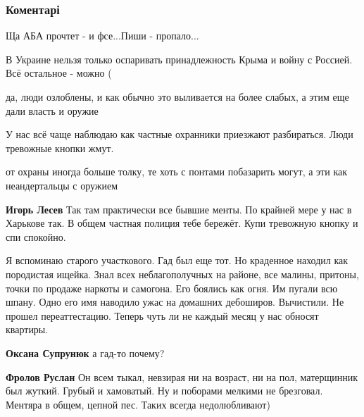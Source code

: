  
 
 
 
 
\subsubsection{Коментарі}
\label{sec:24_06_2019.fb.lesev_igor.1.bespredel_menty.cmt}

\begin{itemize} %
Ща АБА прочтет - и фсе...Пиши - пропало...

В Украине нельзя только оспаривать принадлежность Крыма и войну с Россией. Всё остальное - можно (

да, люди озлоблены, и как обычно это выливается на более слабых, а этим еще дали власть и оружие

У нас всё чаще наблюдаю как частные охранники приезжают разбираться. Люди тревожные кнопки жмут.

\begin{itemize} %
от охраны иногда больше толку, те хоть с понтами побазарить могут, а эти как неандертальцы с оружием

\textbf{Игорь Лесев} Так там практически все бывшие менты. По крайней мере у нас в Харькове так. В общем частная полиция тебе бережёт. Купи тревожную кнопку и спи спокойно.
\end{itemize} %


Я вспоминаю старого участкового. Гад был еще тот. Но краденное находил как
породистая ищейка. Знал всех неблагополучных на районе, все малины,
притоны, точки по продаже наркоты и самогона. Его боялись как огня. Им пугали
всю шпану. Одно его имя наводило ужас на домашних дебоширов. Вычистили. Не
прошел переаттестацию. Теперь чуть ли не каждый месяц у нас обносят квартиры.

\begin{itemize} %
\textbf{Оксана Супрунюк} а гад-то почему?

\textbf{Фролов Руслан} Он всем тыкал, невзирая ни на возраст, ни на пол, матерщинник был жуткий. Грубый и хамоватый. Ну и поборами мелкими не брезговал. Ментяра в общем, цепной пес. Таких всегда недолюбливают)


\end{itemize}
\end{itemize}
